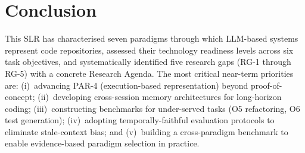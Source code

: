 \section{Conclusion}\label{sec:conclusion}

This SLR has characterised seven paradigms through which LLM-based systems
represent code repositories, assessed their technology readiness levels across
six task objectives, and systematically identified five research gaps (RG-1
through RG-5) with a concrete Research Agenda.  The most critical
near-term priorities are: (i)~advancing PAR-4 (execution-based
representation) beyond proof-of-concept; (ii)~developing cross-session memory
architectures for long-horizon coding; (iii)~constructing benchmarks for
under-served tasks (O5 refactoring, O6 test generation); (iv)~adopting
temporally-faithful evaluation protocols to eliminate stale-context bias; and
(v)~building a cross-paradigm benchmark to enable evidence-based paradigm
selection in practice.
